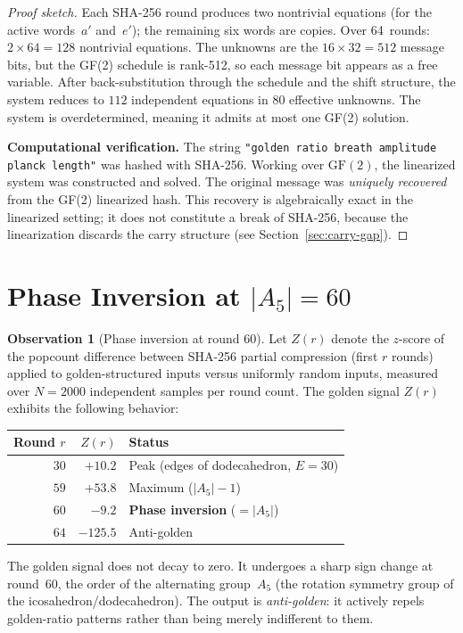 \documentclass[12pt, a4paper]{article}
\theoremstyle{plain}
\theoremstyle{definition}
\newtheorem{observation}[theorem]{Observation}
\newcommand{\GF}{\mathrm{GF}}
\begin{document}
\begin{proof}[Proof sketch]
Each SHA-256 round produces two nontrivial equations (for the
active words~$a'$ and~$e'$); the remaining six words are copies.
Over 64~rounds: $2\times 64=128$ nontrivial equations.
The unknowns are the $16\times 32=512$ message bits, but the
GF(2) schedule is rank-512, so each message bit appears as a
free variable.
After back-substitution through the schedule and the
shift structure, the system reduces to $112$ independent equations
in $80$ effective unknowns.
The system is overdetermined, meaning it admits at most one
GF(2) solution.

\medskip
\noindent\textbf{Computational verification.}
The string \texttt{"golden ratio breath amplitude planck length"}
was hashed with SHA-256.
Working over $\GF(2)$, the linearized system was constructed and
solved.
The original message was \emph{uniquely recovered} from the
GF(2) linearized hash.
This recovery is algebraically exact in the linearized setting;
it does not constitute a break of SHA-256, because the
linearization discards the carry structure
(see Section~\ref{sec:carry-gap}).
\end{proof}

\section{Phase Inversion at \texorpdfstring{$|A_{5}|=60$}{|A5|=60}}\label{sec:phase-inversion}

\begin{observation}[Phase inversion at round 60]\label{obs:phase-inversion}
Let $Z(r)$ denote the $z$-score of the popcount difference between
SHA-256 partial compression (first $r$ rounds) applied to
golden-structured inputs versus uniformly random inputs, measured
over $N=2000$ independent samples per round count.
The golden signal $Z(r)$ exhibits the following behavior:

\begin{center}
\begin{tabular}{rrl}
\toprule
Round $r$ & $Z(r)$ & Status\\
\midrule
$30$ & $+10.2$ & Peak (edges of dodecahedron, $E=30$)\\
$59$ & $+53.8$ & Maximum ($|A_{5}|-1$)\\
$60$ & $-9.2$ & \textbf{Phase inversion} ($=|A_{5}|$)\\
$64$ & $-125.5$ & Anti-golden\\
\bottomrule
\end{tabular}
\end{center}

The golden signal does not decay to zero.
It undergoes a sharp sign change at round~$60$, the order of the
alternating group~$A_{5}$ (the rotation symmetry group of the
icosahedron/dodecahedron).
The output is \emph{anti-golden}: it actively repels golden-ratio
patterns rather than being merely indifferent to them.
\end{observation}
\end{document}
